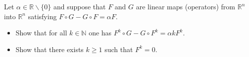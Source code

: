 Let \(\alpha\in\mathbb R\backslash \{ 0 \}\) and suppose that \(F\) and \(G\) are linear maps (operators) from \(\mathbb R^n\) into \(\mathbb R^n\) satisfying \(F\circ G - G\circ F=\alpha F\).
\begin{itemize}

\item[(a)] Show that for all \(k\in\mathbb N\) one has \(F^k\circ G-G\circ F^k=\alpha kF^k\).

\item[(b)] Show that there exists \(k\geq 1\) such that \(F^k=0\).
\end{itemize}
